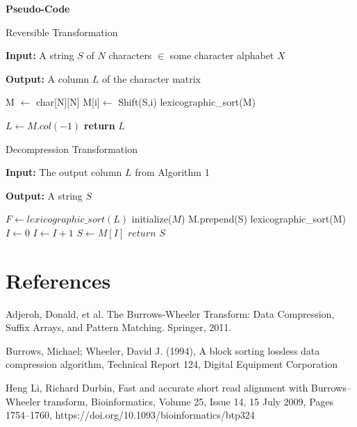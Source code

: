 \documentclass{article}
\begin{document}
\textbf{Pseudo-Code}

    \begin{algorithm}
    \caption{Reversible Transformation}
    \textbf{Input:} A string $S$ of $N$ characters $\in$ some character alphabet $X$
    
    \textbf{Output:} A column $L$ of the character matrix
        \begin{algorithmic}[1]
            \State M $\gets$ char[N][N]      
                \State M[i]$ \gets$ Shift(S,i) 
            \EndFor
            \State lexicographic\_sort(M)
            
            \State $L \gets M.col(-1)$ 
            \State \textbf{return} $L$
            \EndProcedure
        \end{algorithmic}
    \end{algorithm}
\newpage
    \begin{algorithm}
        \caption{Decompression Transformation}
        \textbf{Input:} The output column $L$ from Algorithm 1
    
    \textbf{Output:} A string $S$
        \begin{algorithmic}[1]
            \State $F \gets lexicographic\_sort(L)$
            \State initialize($M$)
                \State M.prepend(S) 
                \State lexicographic\_sort(M)
            \EndFor
           \State $I\gets 0$
                \State $I\gets I+1$
            \EndWhile
            \State $S \gets M[I]$ 
            \State $return$ $S$
            \EndProcedure
        \end{algorithmic}
    \end{algorithm}
       
   \section{References}
   \makebox[.5cm]{[1]} Adjeroh, Donald, et al. The Burrows-Wheeler Transform: Data Compression, Suffix Arrays, and Pattern Matching. Springer, 2011.\par
    \makebox[.5cm]{[2]}  Burrows, Michael; Wheeler, David J. (1994), A block sorting lossless data compression algorithm, Technical Report 124, Digital Equipment Corporation\par
    \makebox[.5cm]{[3]} Heng Li, Richard Durbin, Fast and accurate short read alignment with Burrows–Wheeler transform, Bioinformatics, Volume 25, Issue 14, 15 July 2009, Pages 1754–1760, https://doi.org/10.1093/bioinformatics/btp324\par
\end{document}
